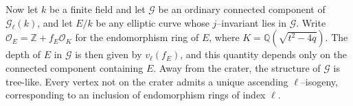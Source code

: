 \documentclass[table]{amsart}
\newcommand{\Z}{\mathbb{Z}}
\newcommand{\Q}{\mathbb{Q}}
\newcommand{\cO}{\mathcal{O}}
\numberwithin{equation}{section}
\begin{document}
\begin{center}
\end{center}
\par Now let $k$ be a finite field and let $\mathcal{G}$ be an ordinary connected component of $\mathcal{G}_\ell(k)$, and let $E/k$ be any elliptic curve whose $j$–invariant lies in $\mathcal{G}$. Write $\cO_E=\Z+f_E\cO_K$ for the endomorphism ring of $E$, where $K=\Q(\sqrt{t^2-4q})$. The depth of $E$ in $\mathcal{G}$ is then given by $v_\ell(f_E)$, and this quantity depends only on the connected component containing $E$. Away from the crater, the structure of $\mathcal{G}$ is tree-like. Every vertex not on the crater admits a unique ascending $\ell$–isogeny, corresponding to an inclusion of endomorphism rings of index $\ell$.
\end{document}
